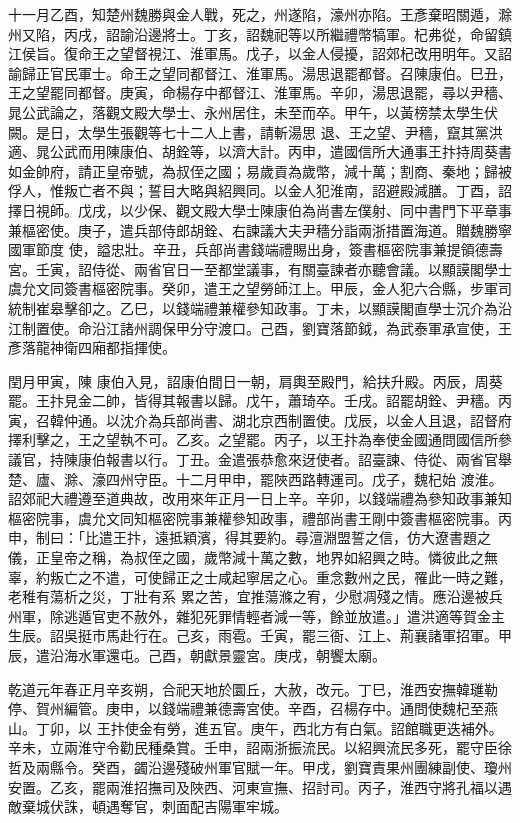 \begin{pinyinscope}
 十一月乙酉，知楚州魏勝與金人戰，死之，州遂陷，濠州亦陷。王彥棄昭關遁，滁
 州又陷，丙戌，詔諭沿邊將士。丁亥，詔魏祀等以所繼禮幣犒軍。杞弗從，命留鎮江侯旨。復命王之望督視江、淮軍馬。戊子，以金人侵擾，詔郊杞改用明年。又詔諭歸正官民軍士。命王之望同都督江、淮軍馬。湯思退罷都督。召陳康伯。巳丑，王之望罷同都督。庚寅，命楊存中都督江、淮軍馬。辛卯，湯思退罷，尋以尹穡、晁公武論之，落觀文殿大學士、永州居住，未至而卒。甲午，以黃榜禁太學生伏闕。是日，太學生張觀等七十二人上書，請斬湯思
 退、王之望、尹穡，竄其黨洪適、晁公武而用陳康伯、胡銓等，以濟大計。丙申，遣國信所大通事王抃持周葵書如金帥府，請正皇帝號，為叔侄之國；易歲貢為歲幣，減十萬；割商、秦地；歸被俘人，惟叛亡者不與；誓目大略與紹興同。以金人犯淮南，詔避殿減膳。丁酉，詔擇日視師。戊戌，以少保、觀文殿大學士陳康伯為尚書左僕射、同中書門下平章事兼樞密使。庚子，遣兵部侍郎胡銓、右諫議大夫尹穡分詣兩浙措置海道。贈魏勝寧國軍節度
 使，謚忠壯。辛丑，兵部尚書錢端禮賜出身，簽書樞密院事兼提領德壽宮。壬寅，詔侍從、兩省官日一至都堂議事，有關臺諫者亦聽會議。以顯謨閣學士虞允文同簽書樞密院事。癸卯，遣王之望勞師江上。甲辰，金人犯六合縣，步軍司統制崔皋擊卻之。乙巳，以錢端禮兼權參知政事。丁未，以顯謨閣直學士沉介為沿江制置使。命沿江諸州調保甲分守渡口。己酉，劉寶落節鉞，為武泰軍承宣使，王彥落龍神衛四廂都指揮使。



 閏月甲寅，陳
 康伯入見，詔康伯間日一朝，肩輿至殿門，給扶升殿。丙辰，周葵罷。王抃見金二帥，皆得其報書以歸。戊午，蕭琦卒。壬戌。詔罷胡銓、尹穡。丙寅，召韓仲通。以沈介為兵部尚書、湖北京西制置使。戊辰，以金人且退，詔督府擇利擊之，王之望執不可。乙亥。之望罷。丙子，以王抃為奉使金國通問國信所參議官，持陳康伯報書以行。丁丑。金遣張恭愈來迓使者。詔臺諫、侍從、兩省官舉楚、廬、滁、濠四州守臣。十二月甲申，罷陜西路轉運司。戊子，魏杞始
 渡淮。詔郊祀大禮遵至道典故，改用來年正月一日上辛。辛卯，以錢端禮為參知政事兼知樞密院事，虞允文同知樞密院事兼權參知政事，禮部尚書王剛中簽書樞密院事。丙申，制曰：「比遣王抃，遠抵穎濱，得其要約。尋澶淵盟誓之信，仿大遼書題之儀，正皇帝之稱，為叔侄之國，歲幣減十萬之數，地界如紹興之時。憐彼此之無辜，約叛亡之不遣，可使歸正之士咸起寧居之心。重念數州之民，罹此一時之難，老稚有蕩析之災，丁壯有系
 累之苦，宜推蕩滌之宥，少慰凋殘之情。應沿邊被兵州軍，除逃遁官吏不赦外，雜犯死罪情輕者減一等，餘並放遣。」遣洪適等賀金主生辰。詔吳挺市馬赴行在。己亥，雨雹。壬寅，罷三衙、江上、荊襄諸軍招軍。甲辰，遣沿海水軍還屯。己酉，朝獻景靈宮。庚戌，朝饗太廟。



 乾道元年春正月辛亥朔，合祀天地於圜丘，大赦，改元。丁巳，淮西安撫韓璡勒停、賀州編管。庚申，以錢端禮兼德壽宮使。辛酉，召楊存中。通問使魏杞至燕山。丁卯，以
 王抃使金有勞，進五官。庚午，西北方有白氣。詔館職更迭補外。辛未，立兩淮守令勸民種桑賞。壬申，詔兩浙振流民。以紹興流民多死，罷守臣徐哲及兩縣令。癸酉，蠲沿邊殘破州軍官賦一年。甲戌，劉寶責果州團練副使、瓊州安置。乙亥，罷兩淮招撫司及陜西、河東宣撫、招討司。丙子，淮西守將孔福以遇敵棄城伏誅，頓遇奪官，刺面配吉陽軍牢城。




\end{pinyinscope}

